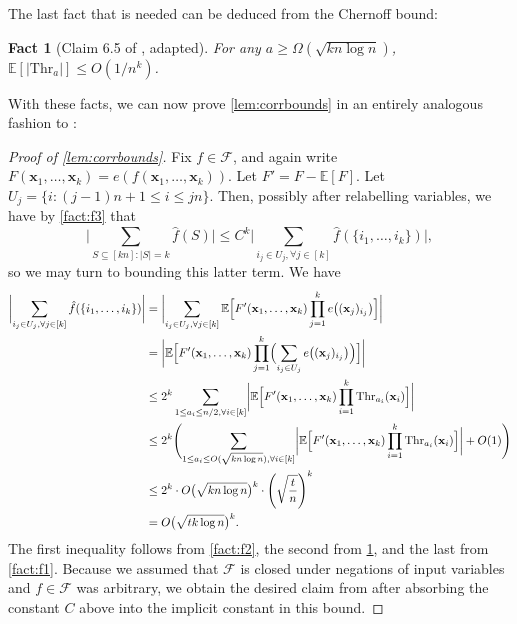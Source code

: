 \documentclass[10pt,a4paper]{article}
\newtheorem{fact}[theorem]{Fact}
\theoremstyle{definition}
\begin{document}
The last fact that is needed can be deduced from the Chernoff bound:
\begin{fact}[Claim 6.5 of \cite{xorlemma}, adapted]
\label{fact:f4}
For any $a\geq \Omega(\sqrt{kn\log n})$, $\mathbb{E}[\vert \mathrm{Thr}_a\vert]\leq O(1/n^k)$.
\end{fact}

With these facts, we can now prove \cref{lem:corrbounds} in an entirely analogous fashion to \cite{xorlemma}:

\begin{proof}[Proof of \cref{lem:corrbounds}]
Fix $f\in \mathcal{F}$, and again write $F(\mathbf{x}_1,\ldots,\mathbf{x}_k)=e(f(\mathbf{x}_1,\ldots,\mathbf{x}_k))$. Let $F'= F-\mathbb{E}[F]$. 
Let $U_j = \{ i :  (j-1)n+1\leq i\leq jn \}$.
Then, possibly after relabelling variables, we have by \cref{fact:f3} that
\[
    \biggl| \sum_{S\subseteq [kn]:\vert S\vert=k} \hat{f}(S)\biggr|
    \leq C^k \biggl| \sum_{ i_j \in U_j , \forall j\in [k]} \hat{f}(\{i_1,\ldots,i_k\})\biggr|,
\]
so we may turn to bounding this latter term. We have
\begin{align*}
    \biggl| \sum_{ i_j \in U_j , \forall j\in [k]} \hat{f}(\{i_1,\ldots,i_k\}) \biggr|
    &= \biggl| \sum_{ i_j \in U_j, \forall j\in [k]} \mathbb{E}\Bigl[F'(\mathbf{x}_1,\ldots,\mathbf{x}_k)\prod_{j=1}^k e\bigl((\mathbf{x}_j)_{i_j}\bigr)\Bigr]\biggr|\\
    &=\biggl| \mathbb{E}\Bigl[F'(\mathbf{x}_1,\ldots,\mathbf{x}_k)\prod_{j=1}^k \Bigl(\sum_{ i_j \in U_j }e\bigl((\mathbf{x}_j)_{i_j}\bigr)\Bigr)\Bigr]\biggr|\\
    &\leq 2^k \sum_{1\leq a_i\leq n/2, \forall i\in [k]} \biggl| \mathbb{E}\Bigl[F'(\mathbf{x}_1,\ldots,\mathbf{x}_k)\prod_{i=1}^k \mathrm{Thr}_{a_i}(\mathbf{x}_i)\Bigr]\biggr|\\
    &\leq 2^k\Biggl(\sum_{1\leq a_i\leq O(\sqrt{kn\log n}), \forall i\in [k]} \biggl| \mathbb{E}\Bigl[F'(\mathbf{x}_1,\ldots,\mathbf{x}_k)\prod_{i=1}^k \mathrm{Thr}_{a_i}(\mathbf{x}_i)\Bigr]\biggr| + O(1)\Biggr)\\
    &\leq 2^k\cdot O\bigl(\sqrt{kn\log n} \bigr)^k\cdot \left(\sqrt{\frac{t}{n}}\right)^k\\
    &= O \bigl(\sqrt{tk\log n} \bigr)^k.
\end{align*}
The first inequality follows from \cref{fact:f2}, the second from \cref{fact:f4}, and the last from \cref{fact:f1}. Because we assumed that $\mathcal{F}$ is closed under negations of input variables and $f\in \mathcal{F}$ was arbitrary, we obtain the desired claim from  after absorbing the constant $C$ above into the implicit constant in this bound.
\end{proof}
\end{document}
